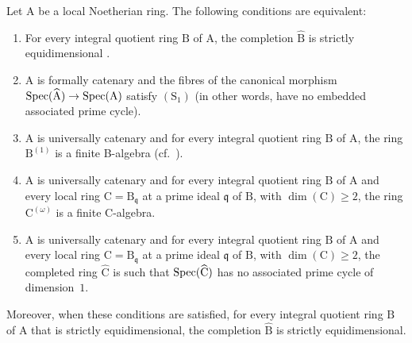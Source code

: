 \begin{theorem}[7.2.5]
\label{IV.7.2.5}
Let $\mathrm{A}$ be a local Noetherian ring.
The following conditions are equivalent:
\begin{enumerate}[label=\emph{\alph*)}]
  \item For every integral quotient ring $\mathrm{B}$ of $\mathrm{A}$, the completion $\widehat{\mathrm{B}}$ is strictly equidimensional .
  \item $\mathrm{A}$ is formally catenary  and the fibres of the canonical morphism $\operatorname{Spec}(\widehat{\mathrm{A}})\to\operatorname{Spec}(\mathrm{A})$ satisfy $(\mathrm{S}_1)$ \textup{(in other words,} have no embedded associated prime cycle\textup{)}.
  \item $\mathrm{A}$ is universally catenary  and for every integral quotient ring $\mathrm{B}$ of $\mathrm{A}$, the ring $\mathrm{B}^{(1)}$ is a finite B-algebra (cf.\ ).
  \item $\mathrm{A}$ is universally catenary and for every integral quotient ring $\mathrm{B}$ of $\mathrm{A}$ and every local ring $\mathrm{C}=\mathrm{B}_\mathfrak{q}$ at a prime ideal $\mathfrak{q}$ of $\mathrm{B}$, with $\dim(\mathrm{C})\geqslant 2$, the ring $\mathrm{C}^{(\omega)}$ is a finite C-algebra.
  \item $\mathrm{A}$ is universally catenary and for every integral quotient ring $\mathrm{B}$ of $\mathrm{A}$ and every local ring $\mathrm{C}=\mathrm{B}_\mathfrak{q}$ at a prime ideal $\mathfrak{q}$ of $\mathrm{B}$, with $\dim(\mathrm{C})\geqslant 2$, the completed ring $\widehat{\mathrm{C}}$ is such that $\operatorname{Spec}(\widehat{\mathrm{C}})$ has no associated prime cycle of dimension~$1$.
\end{enumerate}
Moreover, when these conditions are satisfied, for every integral quotient ring $\mathrm{B}$ of $\mathrm{A}$ that is strictly equidimensional, the completion $\widehat{\mathrm{B}}$ is strictly equidimensional.
\end{theorem}

